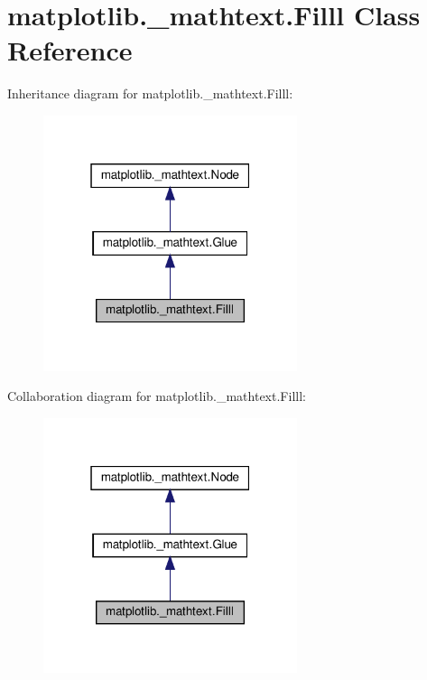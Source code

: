\hypertarget{classmatplotlib_1_1__mathtext_1_1Filll}{}\section{matplotlib.\+\_\+mathtext.\+Filll Class Reference}
\label{classmatplotlib_1_1__mathtext_1_1Filll}


Inheritance diagram for matplotlib.\+\_\+mathtext.\+Filll\+:
\nopagebreak
\begin{figure}[H]
\begin{center}
\leavevmode
\includegraphics[width=211pt]{classmatplotlib_1_1__mathtext_1_1Filll__inherit__graph}
\end{center}
\end{figure}


Collaboration diagram for matplotlib.\+\_\+mathtext.\+Filll\+:
\nopagebreak
\begin{figure}[H]
\begin{center}
\leavevmode
\includegraphics[width=211pt]{classmatplotlib_1_1__mathtext_1_1Filll__coll__graph}
\end{center}
\end{figure}
